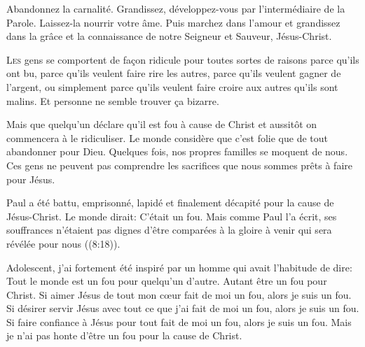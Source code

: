 Abandonnez la carnalité. Grandissez, développez-vous
 par l'intermédiaire de la Parole. Laissez-la nourrir votre âme.
 Puis marchez dans l'amour et grandissez dans la
 grâce et la connaissance de notre Seigneur et Sauveur, Jésus-Christ.

\dvrule






\lettrine{L}{es} gens se comportent de fa\c{c}on ridicule
 pour toutes sortes de raisons \ocadr parce qu'ils ont bu,
 parce qu'ils veulent faire rire les autres,
 parce qu'ils veulent gagner de l'argent,
 ou simplement parce qu'ils veulent faire croire aux autres qu'ils sont malins.
 Et personne ne semble trouver \c{c}a bizarre.

Mais que quelqu'un déclare qu'il est fou à cause de Christ
 et aussitôt on commencera à le ridiculiser.
 Le monde considère que c'est folie que de tout abandonner pour Dieu.
 Quelques fois, nos propres familles se moquent de nous.
 Ces gens ne peuvent pas comprendre les sacrifices
 que nous sommes prêts à faire pour Jésus.

Paul a été battu, emprisonné, lapidé et finalement décapité
 pour la cause de Jésus-Christ. Le monde dirait: 
 \Og C'était un fou. \Fg{}
 Mais comme Paul l'a écrit, ses souffrances n'étaient pas
 \Og dignes d'être comparées à la gloire à venir
 qui sera révélée pour nous \Fg{}\linebreak ((8:18)).


Adolescent, j'ai fortement été inspiré par un homme
 qui avait l'habitude de dire: 
 \Og Tout le monde est un fou pour quelqu'un d'autre.
 Autant être un fou pour Christ. \Fg{}
 Si aimer Jésus de tout mon c\oe{}ur fait de moi un fou,
 alors je suis un fou. Si désirer servir Jésus avec tout ce que j'ai
 fait de moi un fou, alors je suis un fou.
 Si faire confiance à Jésus pour tout fait de moi un fou,
 alors je suis un fou.
 Mais je n'ai pas honte d'être un fou pour la cause de Christ.


